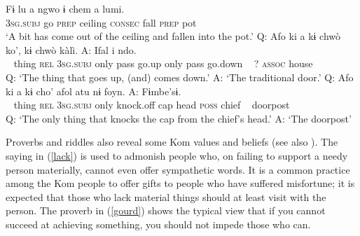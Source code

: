 \documentclass[output=paper,colorlinks,citecolor=brown
]{langscibook}
\begin{document}
\ea \label{built-env}
\begin{xlist}
\ex \label{ceiling}
\gll Fɨ lu a ngwo ɨ chem a lumi.\\
\textsc{3sg.subj} go \textsc{prep} ceiling \textsc{consec} fall \textsc{prep} pot\\
\glt `A bit has come out of the ceiling and fallen into the pot.' %
\ex \label{door-riddle}
\gll Q: Afo ki a kɨ chwò ko', kɨ chwò kàlì. A: Ifal i ndo.\\
{~} thing \textsc{rel} \textsc{3sg.subj} only pass go.up only pass go.down {~} ? \textsc{assoc} house\\
\glt Q: `The thing that goes up, (and) comes down.' A: `The traditional door.' 
\ex \label{doorpost-riddle}
\gll Q: Afo ki a kɨ cho' afol atu nɨ foyn. A: Fɨmbe'sɨ.\\
{~} thing \textsc{rel} \textsc{3sg.subj} only knock.off cap head \textsc{poss} chief {~} doorpost\\
\glt Q: `The only thing that knocks the cap from the chief's head.' A: `The doorpost'
\end{xlist}
\z

Proverbs and riddles also reveal some Kom values and beliefs (see also \citealt{tosam2014philosophical, njwe2015palm}). 
The saying in (\ref{lack}) is used to admonish people who, on failing to support a needy person materially, cannot even offer sympathetic words. It is a common practice among the Kom people to offer gifts to people who have suffered misfortune; it is expected that those who lack material things should at least visit with the person. 
The proverb in (\ref{gourd}) shows the typical view that if you cannot succeed at achieving something, you should not impede those who can.


\end{document}

